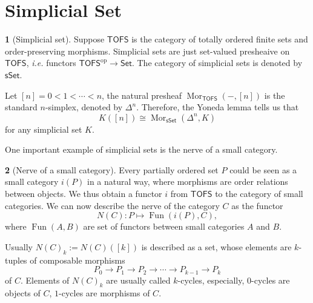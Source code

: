 \documentclass[12pt]{article}
\theoremstyle{definition}
\newtheorem{para}{}[section]
\theoremstyle{plain}
\begin{document}
\section{Simplicial Set}

\begin{para}[Simplicial set]
    Suppose $\mathsf{TOFS}$ is the category of totally ordered finite sets and order-preserving morphisms. Simplicial sets are just set-valued presheaive on $\mathsf{TOFS}$, {\it i.e.} functors $\mathsf{TOFS}^{\text{op}}\to \mathsf{Set}$. The category of simplicial sets is denoted by $\mathsf{sSet}$.
\end{para}

Let $[n]=0<1<\cdots<n$, the natural presheaf $\operatorname{Mor}_{\mathsf{TOFS}}(-,[n])$ is the standard $n$-simplex, denoted by $\Delta^n$. Therefore, the Yoneda lemma tells us that
\[
    K([n])\cong\operatorname{Mor}_{\mathsf{sSet}}(\Delta^n,K) 
\]
for any simplicial set $K$.


One important example of simplicial sets is the nerve of a small category.

\begin{para}[Nerve of a small category]
    Every partially ordered set $P$ could be seen as a small category $i(P)$ in a natural way, where morphisms are order relations between objects. We thus obtain a functor $i$ from $\mathsf{TOFS}$ to the category of small categories. We can now describe the nerve of the category $C$ as the functor
    \[
        N(C): P \mapsto \operatorname{Fun}(i(P),C),
    \]
    where $\operatorname{Fun}(A,B)$ are set of functors between small categories $A$ and $B$.
\end{para}

Usually $N(C)_k:=N(C)([k])$ is described as a set, whose elements are $k$-tuples of composable morphisms
\[
    P_0\to P_1\to P_2\to \cdots \to P_{k-1}\to P_k
\]
of $C$. Elements of $N(C)_k$ are usually called $k$-cycles, especially, $0$-cycles are objects of $C$, $1$-cycles are morphisms of $C$. 
\end{document}
